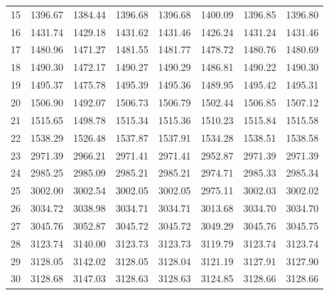 \documentclass[10pt,oneside]{article}
\begin{document}
\begin{table}[h!]
\begin{tabular}{cccccccc}
15 &   1396.67 & 1384.44 & 1396.68 &    1396.68 &      1400.09 & 1396.85 &   1396.80 \\
16 &   1431.74 & 1429.18 & 1431.62 &    1431.46 &      1426.24 & 1431.24 &   1431.46 \\
17 &   1480.96 & 1471.27 & 1481.55 &    1481.77 &      1478.72 & 1480.76 &   1480.69 \\
18 &   1490.30 & 1472.17 & 1490.27 &    1490.29 &      1486.81 & 1490.22 &   1490.30 \\
19 &   1495.37 & 1475.78 & 1495.39 &    1495.36 &      1489.95 & 1495.42 &   1495.31 \\
20 &   1506.90 & 1492.07 & 1506.73 &    1506.79 &      1502.44 & 1506.85 &   1507.12 \\
21 &   1515.65 & 1498.78 & 1515.34 &    1515.36 &      1510.23 & 1515.84 &   1515.58 \\
22 &   1538.29 & 1526.48 & 1537.87 &    1537.91 &      1534.28 & 1538.51 &   1538.58 \\
23 &   2971.39 & 2966.21 & 2971.41 &    2971.41 &      2952.87 & 2971.39 &   2971.39 \\
24 &   2985.25 & 2985.09 & 2985.21 &    2985.21 &      2974.71 & 2985.33 &   2985.34 \\
25 &   3002.00 & 3002.54 & 3002.05 &    3002.05 &      2975.11 & 3002.03 &   3002.02 \\
26 &   3034.72 & 3038.98 & 3034.71 &    3034.71 &      3013.68 & 3034.70 &   3034.70 \\
27 &   3045.76 & 3052.87 & 3045.72 &    3045.72 &      3049.29 & 3045.76 &   3045.75 \\
28 &   3123.74 & 3140.00 & 3123.73 &    3123.73 &      3119.79 & 3123.74 &   3123.74 \\
29 &   3128.05 & 3142.02 & 3128.05 &    3128.04 &      3121.19 & 3127.91 &   3127.90 \\
30 &   3128.68 & 3147.03 & 3128.63 &    3128.63 &      3124.85 & 3128.66 &   3128.66 \\
\bottomrule
\end{tabular}
\end{table}
\end{document}
